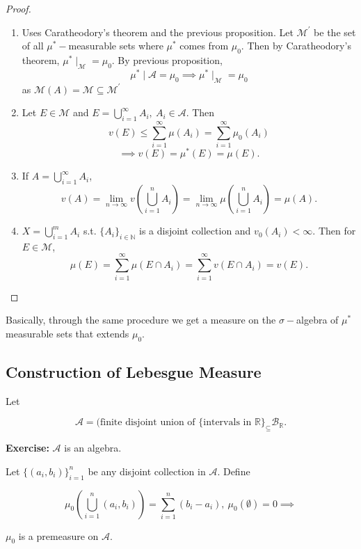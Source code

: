 \documentclass{functionspaces}
\begin{document}
\begin{proof}
\begin{enumerate}
    \item Uses Caratheodory's theorem and the previous proposition. Let $\mathcal{M}^{\prime}$ be the set of all $\mu^{*}-$measurable sets where $\mu^{*}$ comes from $\mu_{0}$. Then by Caratheodory's theorem, $\mu^{*} \mid_{\mathcal{M}} = \mu_{0}$. By previous proposition,
    \[
    \mu^{*} \mid \mathcal{A} = \mu_{0} \implies \mu^{*} \mid_{\mathcal{M}} = \mu_{0}
    \]
    as $\mathcal{M}(A) = \mathcal{M} \subseteq \mathcal{M}^{\prime}$
    
    \item Let $E \in \mathcal{M}$ and $E = \bigcup_{i=1}^{\infty} A_{i},\ A_{i} \in \mathcal{A}$. Then
    \[
    v(E) \leq \sum_{i=1}^{\infty} \mu(A_{i}) = \sum_{i=1}^{\infty} \mu_{0}(A_{i})
    \]
    \[
    \implies v(E) = \mu^{*}(E) = \mu(E).
    \]
    
    \item If $A = \bigcup_{i=1}^{\infty} A_{i}$,
    \[
    v(A) = \lim_{n \to \infty} v\left(\bigcup_{i=1}^{n} A_{i}\right) = \lim_{n \to \infty} \mu\left(\bigcup_{i=1}^{n} A_{i}\right) = \mu(A).
    \]
    
    \item $X = \bigcup_{i=1}^{m} A_{i}$ s.t. $\{A_{i}\}_{i \in \mathbb{N}}$ is a disjoint collection and $v_{0}(A_{i}) < \infty.$ Then for $E \in \mathcal{M}$,
    \[
    \mu(E) = \sum_{i=1}^{\infty} \mu(E \cap A_{i}) = \sum_{i=1}^{\infty} v(E \cap A_{i}) = v(E).
    \]
\end{enumerate}
\end{proof}

\begin{remark}
Basically, through the same procedure we get a measure on the $\sigma-$algebra of $\mu^{*}$ measurable sets that extends $\mu_{0}$.
\end{remark}

\subsection{Construction of Lebesgue Measure} Let

\[
\mathcal{A} = (\text{finite disjoint union of } \{\text{intervals in } \mathbb{R}\}_{\subseteq} \mathcal{B}_{\mathbb{R}}.
\]

\noindent\textbf{Exercise:} $\mathcal{A}$ is an algebra.

\begin{proposition}
Let $\{(a_{i},b_{i})\}_{i=1}^{n}$ be any disjoint collection in $\mathcal{A}.$ Define

\[
\mu_{0}\left(\bigcup_{i=1}^{n} (a_{i},b_{i})\right) = \sum_{i=1}^{n} (b_{i} - a_{i}),\ \mu_{0}(\emptyset) = 0 \implies
\]

$\mu_{0}$ is a premeasure on $\mathcal{A}.$
\end{proposition}
\end{document}

